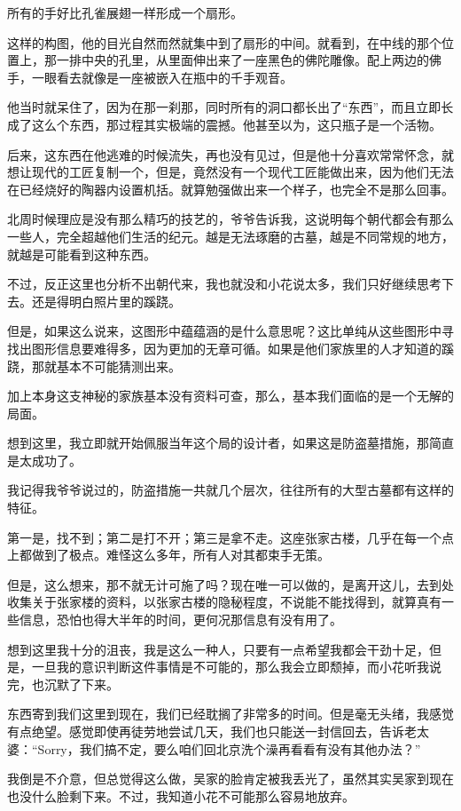 所有的手好比孔雀展翅一样形成一个扇形。

这样的构图，他的目光自然而然就集中到了扇形的中间。就看到，在中线的那个位置上，那一排中央的孔里，从里面伸出来了一座黑色的佛陀雕像。配上两边的佛手，一眼看去就像是一座被嵌入在瓶中的千手观音。

他当时就呆住了，因为在那一刹那，同时所有的洞口都长出了“东西”，而且立即长成了这么个东西，那过程其实极端的震撼。他甚至以为，这只瓶子是一个活物。

后来，这东西在他逃难的时候流失，再也没有见过，但是他十分喜欢常常怀念，就想让现代的工匠复制一个，但是，竟然没有一个现代工匠能做出来，因为他们无法在已经烧好的陶器内设置机括。就算勉强做出来一个样子，也完全不是那么回事。

北周时候理应是没有那么精巧的技艺的，爷爷告诉我，这说明每个朝代都会有那么一些人，完全超越他们生活的纪元。越是无法琢磨的古墓，越是不同常规的地方，就越是可能看到这种东西。

不过，反正这里也分析不出朝代来，我也就没和小花说太多，我们只好继续思考下去。还是得明白照片里的蹊跷。

但是，如果这么说来，这图形中蕴蕴涵的是什么意思呢？这比单纯从这些图形中寻找出图形信息要难得多，因为更加的无章可循。如果是他们家族里的人才知道的蹊跷，那就基本不可能猜测出来。

加上本身这支神秘的家族基本没有资料可查，那么，基本我们面临的是一个无解的局面。

想到这里，我立即就开始佩服当年这个局的设计者，如果这是防盗墓措施，那简直是太成功了。

我记得我爷爷说过的，防盗措施一共就几个层次，往往所有的大型古墓都有这样的特征。

第一是，找不到；第二是打不开；第三是拿不走。这座张家古楼，几乎在每一个点上都做到了极点。难怪这么多年，所有人对其都束手无策。

但是，这么想来，那不就无计可施了吗？现在唯一可以做的，是离开这儿，去到处收集关于张家楼的资料，以张家古楼的隐秘程度，不说能不能找得到，就算真有一些信息，恐怕也得大半年的时间，更何况那信息有没有用了。

想到这里我十分的沮丧，我是这么一种人，只要有一点希望我都会干劲十足，但是，一旦我的意识判断这件事情是不可能的，那么我会立即颓掉，而小花听我说完，也沉默了下来。

东西寄到我们这里到现在，我们已经耽搁了非常多的时间。但是毫无头绪，我感觉有点绝望。感觉即使再徒劳地尝试几天，我们也只能送一封信回去，告诉老太婆：“Sorry，我们搞不定，要么咱们回北京洗个澡再看看有没有其他办法？”

我倒是不介意，但总觉得这么做，吴家的脸肯定被我丢光了，虽然其实吴家到现在也没什么脸剩下来。不过，我知道小花不可能那么容易地放弃。

